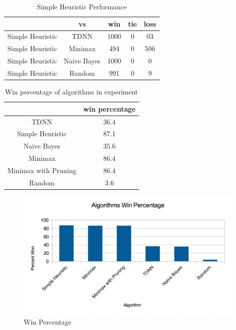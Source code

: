 \documentclass[12pt,letterpaper]{article}
\begin{document}
\begin{table}[h]
\begin{center}
\begin{tabular}{|c||c|c|c|c|}
\hline
& vs & win & tie & loss\\
\hline \hline
Simple Heuristic & TDNN & 1000 & 0 & 03\\
\hline 
Simple Heuristic & Minimax & 494 & 0 & 506\\
\hline 
Simple Heuristic & Naive Bayes & 1000 & 0 & 0\\
\hline 
Simple Heuristic & Random & 991 & 0 & 9\\
\hline 
\end{tabular}
\end{center}
\caption{Simple Heuristic Performance}
\label{HeuristicTable}
\end{table}

\begin{table}[h]
\begin{center}
\begin{tabular}{|c||c|}
\hline
& win percentage\\
\hline \hline
TDNN & 36.4\\
\hline 
Simple Heuristic & 87.1\\
\hline 
Naive Bayes & 35.6\\
\hline 
Minimax & 86.4\\
\hline 
Minimax with Pruning & 86.4\\
\hline 
Random & 3.6\\
\hline 
\end{tabular}
\end{center}
\caption{Win percentage of algorithms in experiment}
\label{WinPercentTable}
\end{table}

\begin{figure}[h]
\begin{center}
\includegraphics[width=7in]{winpercent.png}
\end{center}
\caption{Win Percentage}
\label{WinGraph}
\end{figure}
\end{document}
